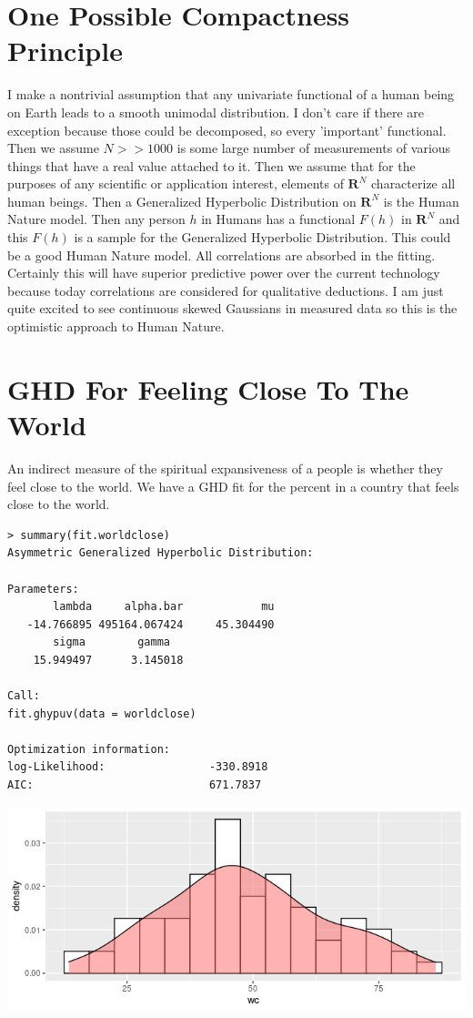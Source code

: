 \documentclass{amsart}
\begin{document}
\section{One Possible Compactness Principle}

I make a nontrivial assumption that any univariate functional of a human being on Earth leads to a smooth unimodal distribution.  I don't care if there are exception because those could be decomposed, so every 'important' functional.  Then we assume $N>>1000$ is some large number of measurements of various things that have a real value attached to it.  Then we assume that for the purposes of any scientific or application interest, elements of $\mathbf{R}^N$ characterize all human beings.  Then a Generalized Hyperbolic Distribution on $\mathbf{R}^N$ is the Human Nature model.  Then any person $h$ in Humans has a functional $F(h)$ in $\mathbf{R}^N$ and this $F(h)$ is a sample for the Generalized Hyperbolic Distribution.  This could be a good Human Nature model.  All correlations are absorbed in the fitting.  Certainly this will have superior predictive power over the current technology because today correlations are considered for qualitative deductions.  I am just quite excited to see continuous skewed Gaussians in measured data so this is the optimistic approach to Human Nature.

\section{GHD For Feeling Close To The World}

An indirect measure of the spiritual expansiveness of a people is whether they feel close to the world.  We have a GHD fit for the percent in a country that feels close to the world.

\begin{verbatim}
> summary(fit.worldclose)
Asymmetric Generalized Hyperbolic Distribution:

Parameters:
       lambda     alpha.bar            mu
   -14.766895 495164.067424     45.304490
       sigma        gamma
    15.949497      3.145018 

Call:
fit.ghypuv(data = worldclose)

Optimization information:
log-Likelihood:                -330.8918 
AIC:                           671.7837 
\end{verbatim}

\includegraphics[scale=0.7]{worldclose.png}
\end{document}
